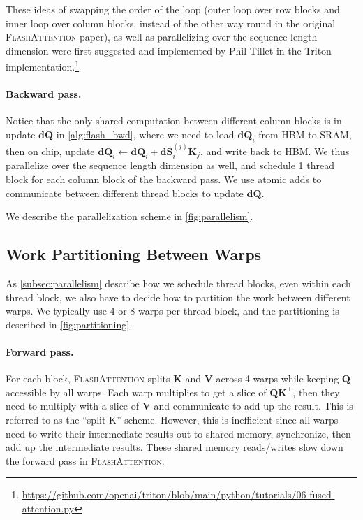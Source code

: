 These ideas of swapping the order of the loop (outer loop over row blocks and inner loop over column blocks, instead of the other way round in the original
\textsc{FlashAttention} paper), as well as parallelizing over the sequence length dimension were first suggested and implemented by Phil Tillet in the Triton~\citep{tillet2019triton}
implementation.\footnote{\url{https://github.com/openai/triton/blob/main/python/tutorials/06-fused-attention.py}}

\paragraph{Backward pass.} Notice that the only shared computation between different column blocks is in update $\mathbf{dQ}$ in \ref{alg:flash_bwd}, where we need to load $\mathbf{dQ}_i$ from HBM to SRAM, then on chip, update
$\mathbf{dQ}_{i} \leftarrow \mathbf{dQ}_i + \mathbf{dS}_{i}^{(j)} \mathbf{K}_j$, and write back to HBM. We thus parallelize over the sequence length dimension as well, and schedule 1 thread block for each column block of the backward pass. We use atomic adds to communicate between different thread blocks to update $\mathbf{dQ}$.

We describe the parallelization scheme in \ref{fig:parallelism}.

\subsection{Work Partitioning Between Warps}
\label{subsec:work_partitioning}

As \ref{subsec:parallelism} describe how we schedule thread blocks, even within each thread block, we also have to decide how to partition the work between different warps. We typically use 4 or 8 warps per thread block, and the partitioning is described in \ref{fig:partitioning}.

\paragraph{Forward pass.} For each block, \textsc{FlashAttention} splits $\mathbf{K}$ and $\mathbf{V}$ across 4 warps while keeping
$\mathbf{Q}$ accessible by all warps. Each warp multiplies to get a slice of $\mathbf{Q} \mathbf{K}^\top$, then they need to multiply with a slice of $\mathbf{V}$ and communicate to add up the result. This is referred to as the ``split-K'' scheme. However, this is inefficient since all warps need to write their intermediate results out to shared memory, synchronize, then add up the intermediate results. These shared memory reads/writes slow down the forward pass in \textsc{FlashAttention}.

